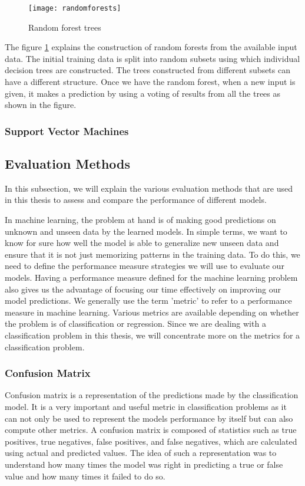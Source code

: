 \documentclass[11pt,openright]{report}
\begin{document}
  \begin{figure}
	\centering
	\texttt{[image: randomforests]}
	\caption{Random forest trees}
	\label{fig:random_forest_trees}
\end{figure} 

The figure \ref{fig:random_forest_trees} explains the construction of random forests from the available input data. The initial training data is split into random subsets using which individual decision trees are constructed. The trees constructed from different subsets can have a different structure. Once we have the random forest, when a new input is given, it makes a prediction by using a voting of results from all the trees as shown in the figure.

\subsubsection {Support Vector Machines }

\subsection {Evaluation Methods}
In this subsection, we will explain the various evaluation methods that are used in this thesis to assess and compare the performance of different models.

In machine learning, the problem at hand is of making good predictions on unknown and unseen data by the learned models. In simple terms, we want to know for sure how well the model is able to generalize new unseen data and ensure that it is not just memorizing patterns in the training data. To do this, we need to define the performance measure strategies we will use to evaluate our models. Having a performance measure defined for the machine learning problem also gives us the advantage of focusing our time effectively on improving our model predictions. We generally use the term 'metric' to refer to a performance measure in machine learning. Various metrics are available depending on whether the problem is of  classification or regression. Since we are dealing with a classification problem in this thesis, we will concentrate more on the metrics for a classification problem.

\subsubsection {Confusion Matrix}
Confusion matrix is a representation of the predictions made by the classification model. It is a very important and useful metric in classification problems as it can not only be used to represent the models performance by itself but can also compute other metrics. A confusion matrix is composed of statistics such as true positives, true negatives, false positives, and false negatives, which are calculated using actual and predicted values. The idea of such a representation was to understand how many times the model was right in predicting a true or false value and how many times it failed to do so.
\end{document}
